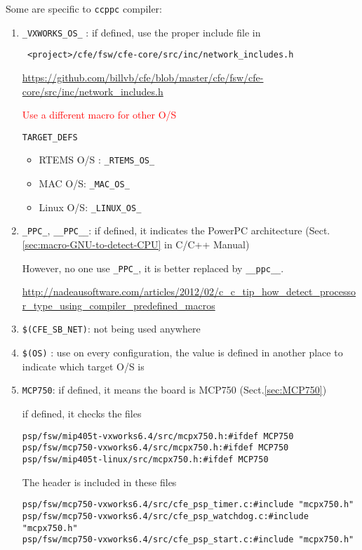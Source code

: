 Some are specific to \verb!ccppc! compiler: 
\begin{enumerate}
  \item \verb!_VXWORKS_OS_! : if defined, use the proper include file in 
  
 \begin{verbatim}
 <project>/cfe/fsw/cfe-core/src/inc/network_includes.h
 \end{verbatim}
 \url{https://github.com/billvb/cfe/blob/master/cfe/fsw/cfe-core/src/inc/network_includes.h}
 
 \textcolor{red}{Use a different macro for other O/S}
 
 \verb!TARGET_DEFS! 
 \begin{itemize}
   \item RTEMS O/S : \verb!_RTEMS_OS_!
   
   \item MAC O/S: \verb!_MAC_OS_!
   
   \item Linux O/S: \verb!_LINUX_OS_!
 \end{itemize}
  
  \item \verb!_PPC_!,  \verb!__PPC__!: if defined, it indicates the PowerPC
  architecture (Sect.\ref{sec:macro-GNU-to-detect-CPU} in C/C++ Manual)
  
  However, no one use \verb!_PPC_!, it is better replaced by \verb!__ppc__!.
  
  \url{http://nadeausoftware.com/articles/2012/02/c_c_tip_how_detect_processor_type_using_compiler_predefined_macros}
  
  \item \verb!$(CFE_SB_NET)!: not being used anywhere
  
  \item \verb!$(OS)! : use on every configuration, the value is defined in
  another place to indicate which target O/S is
  
  \item \verb!MCP750!: if defined, it means the board is MCP750
  (Sect.\ref{sec:MCP750})
  
  if defined, it checks the files
\begin{verbatim}
psp/fsw/mip405t-vxworks6.4/src/mcpx750.h:#ifdef MCP750
psp/fsw/mcp750-vxworks6.4/src/mcpx750.h:#ifdef MCP750
psp/fsw/mip405t-linux/src/mcpx750.h:#ifdef MCP750
\end{verbatim}
The header is included in these files
\begin{verbatim}
psp/fsw/mcp750-vxworks6.4/src/cfe_psp_timer.c:#include "mcpx750.h"
psp/fsw/mcp750-vxworks6.4/src/cfe_psp_watchdog.c:#include "mcpx750.h"
psp/fsw/mcp750-vxworks6.4/src/cfe_psp_start.c:#include "mcpx750.h"
\end{verbatim}
  

\end{enumerate}
